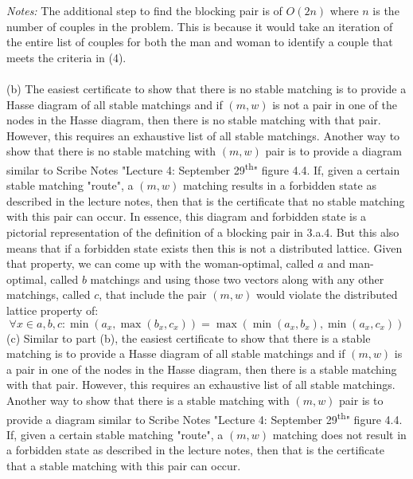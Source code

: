 \textit{Notes:} The additional step to find the blocking pair is of $O(2n)$ where $n$ is the number of couples in the problem. This is because it would take an iteration of the entire list of couples for both the man and woman to identify a couple that meets the criteria in (4).\\\\
(b) The easiest certificate to show that there is no stable matching is to provide a Hasse diagram of all stable matchings and if $(m,w)$ is not a pair in one of the nodes in the Hasse diagram, then there is no stable matching with that pair. However, this requires an exhaustive list of all stable matchings. Another way to show that there is no stable matching with $(m,w)$ pair is to provide a diagram similar to Scribe Notes "Lecture 4: September 29\textsuperscript{th}" figure 4.4. If, given a certain stable matching "route", a $(m,w)$ matching results in a forbidden state as described in the lecture notes, then that is the certificate that no stable matching with this pair can occur. In essence, this diagram and forbidden state is a pictorial representation of the definition of a blocking pair in 3.a.4. But this also means that if a forbidden state exists then this is not a distributed lattice. Given that property, we can come up with the woman-optimal, called $a$ and man-optimal, called $b$ matchings and using those two vectors along with any other matchings, called $c$, that include the pair $(m,w)$ would violate the distributed lattice property of:
\[
\forall x \in a,b,c: \min(a_x, \max(b_x, c_x)) = \max(\min(a_x, b_x), \min(a_x, c_x))
\]
(c) Similar to part (b), the easiest certificate to show that there is a stable matching is to provide a Hasse diagram of all stable matchings and if $(m,w)$ is a pair in one of the nodes in the Hasse diagram, then there is a stable matching with that pair. However, this requires an exhaustive list of all stable matchings. Another way to show that there is a stable matching with $(m,w)$ pair is to provide a diagram similar to Scribe Notes "Lecture 4: September 29\textsuperscript{th}" figure 4.4. If, given a certain stable matching "route", a $(m,w)$ matching does not result in a forbidden state as described in the lecture notes, then that is the certificate that a stable matching with this pair can occur. 